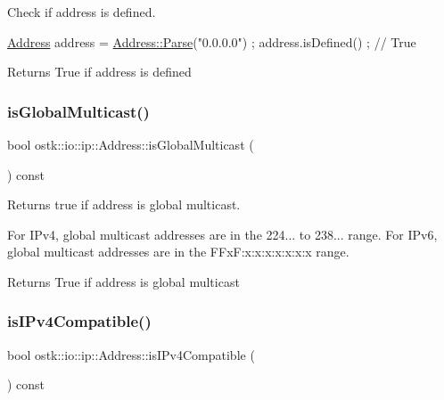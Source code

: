 Check if address is defined. 


\begin{DoxyCode}
\hyperlink{classostk_1_1io_1_1ip_1_1_address_a4118f42388b11fb003c9fb782f4ca04f}{Address} address = \hyperlink{classostk_1_1io_1_1ip_1_1_address_a3d60e44d816e30f17db36f9bb7ac6307}{Address::Parse}(\textcolor{stringliteral}{"0.0.0.0"}) ;
address.isDefined() ; \textcolor{comment}{// True}
\end{DoxyCode}


\begin{DoxyReturn}{Returns}
True if address is defined 
\end{DoxyReturn}
\mbox{\label{classostk_1_1io_1_1ip_1_1_address_a86687f373b37c64f4692465de5e96f26}} 
\subsubsection{\texorpdfstring{is\+Global\+Multicast()}{isGlobalMulticast()}}
{\footnotesize\ttfamily bool ostk\+::io\+::ip\+::\+Address\+::is\+Global\+Multicast (\begin{DoxyParamCaption}{ }\end{DoxyParamCaption}) const}



Returns true if address is global multicast. 

For I\+Pv4, global multicast addresses are in the 224... to 238... range. For I\+Pv6, global multicast addresses are in the F\+Fx\+F\+:x\+:x\+:x\+:x\+:x\+:x\+:x range.

\begin{DoxyReturn}{Returns}
True if address is global multicast 
\end{DoxyReturn}
\mbox{\label{classostk_1_1io_1_1ip_1_1_address_a3a555f0509c7ec00ed45fbd09f993414}} 
\subsubsection{\texorpdfstring{is\+I\+Pv4\+Compatible()}{isIPv4Compatible()}}
{\footnotesize\ttfamily bool ostk\+::io\+::ip\+::\+Address\+::is\+I\+Pv4\+Compatible (\begin{DoxyParamCaption}{ }\end{DoxyParamCaption}) const}



